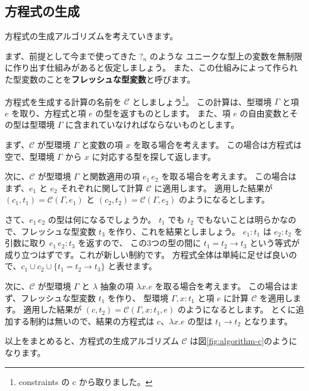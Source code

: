 \subsection{方程式の生成}

方程式の生成アルゴリズムを考えていきます。

まず、前提として今まで使ってきた $?_n$ のような
ユニークな型上の変数を無制限に作り出す仕組みがあると仮定しましょう。
また、この仕組みによって作られた型変数のことを\textbf{フレッシュな型変数}と呼びます。

方程式を生成する計算の名前を $\mathcal C$ としましょう\footnote{constraints の c から取りました。}。
この計算は、型環境 $\Gamma$ と項 $e$ を取り、方程式と項 $e$ の型を返すものとします。
また、項 $e$ の自由変数とその型は型環境 $\Gamma$ に含まれていなければならないものとします。

まず、$\mathcal C$ が型環境 $\Gamma$ と変数の項 $x$ を取る場合を考えます。
この場合は方程式は空で、型環境 $\Gamma$ から $x$ に対応する型を探して返します。

次に、$\mathcal C$ が型環境 $\Gamma$ と関数適用の項 $e_1 \, e_2$ を取る場合を考えます。
この場合はまず、$e_1$ と $e_2$ それぞれに関して計算 $\mathcal C$ に適用します。
適用した結果が $(c_1, t_1) = \mathcal{C}(\Gamma, e_1)$ と $(c_2, t_2) = \mathcal{C}(\Gamma, e_2)$
のようになるとします。

さて、$e_1 \, e_2$ の型は何になるでしょうか。
$t_1$ でも $t_2$ でもないことは明らかなので、フレッシュな型変数 $t_3$ を作り、これを結果としましょう。
$e_1 : t_1$ は $e_2 : t_2$ を引数に取り $e_1 \, e_2 : t_3$ を返すので、
この3つの型の間に $t_1 = t_2 \to t_3$ という等式が成り立つはずです。これが新しい制約です。
方程式全体は単純に足せば良いので、$c_1 \cup c_2 \cup \{t_1 = t_2 \to t_3\}$ と表せます。

次に、$\mathcal C$ が型環境 $\Gamma$ と $\lambda$ 抽象の項 $\lambda x . e$ を取る場合を考えます。
この場合はまず、フレッシュな型変数 $t_1$ を作り、
型環境 $\Gamma, x : t_1$ と項 $e$ に計算 $\mathcal C$ を適用します。
適用した結果が $(c, t_2) = \mathcal{C}(\Gamma, x : t_1, e)$ のようになるとします。
とくに追加する制約は無いので、結果の方程式は $c$、$\lambda x . e$ の型は $t_1 \to t_2$ となります。

以上をまとめると、方程式の生成アルゴリズム $\mathcal C$ は図\ref{fig:algorithm-c}のようになります。

